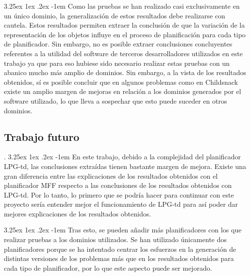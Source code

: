 \documentclass{article}
\makeatletter
\renewcommand\paragraph{\@startsection{paragraph}{5}{\z@}%
  {3.25ex \@plus1ex \@minus.2ex}%
  {-1em}%
  {\normalfont\normalsize\bfseries}}
\makeatother
\begin{document}
\paragraph{}
Como las pruebas se han realizado casi exclusivamente en un único dominio, la generalización de estos resultados debe realizarse con cautela. Estos resultados permiten extraer la conclusión de que la variación de la representación de los objetos influye en el proceso de planificación para cada tipo de planificador. Sin embargo, no es posible extraer conclusiones concluyentes referentes a la utilidad del software de terceros desarrolladores utilizados en este trabajo ya que para eso hubiese sido necesario realizar estas pruebas con un abanico mucho más amplio de dominios. Sin embargo, a la vista de los resultados obtenidos, sí es posible concluir que en algunos problemas como en Childsnack existe un amplio margen de mejoras en relación a los dominios generados por el software utilizado, lo que lleva a sospechar que esto puede suceder en otros dominios.

\subsection{Trabajo futuro}
.\paragraph{}
En este trabajo, debido a la complejidad del planificador LPG-td, las conclusiones extraídas tienen bastante margen de mejora. Existe una gran diferencia entre las explicaciones de los resultados obtenidos con el planificador MFF respecto a las conclusiones de los resultados obtenidos con LPG-td. Por lo tanto, lo primero que se podría hacer para continuar con este proyecto sería entender mejor el funcionamiento de LPG-td para así poder dar mejores explicaciones de los resultados obtenidos.

\paragraph{}
Tras esto, se pueden añadir más planificadores con los que realizar pruebas a los dominios utilizados. Se han utilizado únicamente dos planificadores porque se ha intentado centrar los esfuerzos en la generación de distintas versiones de los problemas más que en los resultados obtenidos para cada tipo de planificador, por lo que este aspecto puede ser mejorado.
\end{document}
